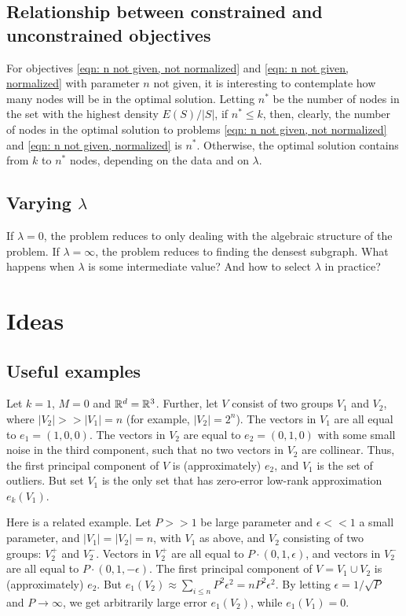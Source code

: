 \documentclass{article}
\begin{document}
\subsection{Relationship between constrained and unconstrained objectives}
For objectives \ref{eqn: n not given, not normalized} and \ref{eqn: n not given, normalized} with parameter $n$ not given, it is interesting to contemplate how many nodes will be in the optimal solution. Letting $n^*$ be the number of nodes in the set with the highest density $E(S)/|S|$,
if $n^* \leq k$, then, clearly, the number of nodes in the optimal solution to problems \ref{eqn: n not given, not normalized} and \ref{eqn: n not given, normalized} is $n^*$. Otherwise, the optimal solution contains from $k$ to $n^*$ nodes, depending on the data and on $\lambda$.

\subsection{Varying $\lambda$}
If $\lambda = 0$, the problem reduces to only dealing with the algebraic structure of the problem. If $\lambda = \infty$, the problem reduces to finding the densest subgraph. What happens when $\lambda$ is some intermediate value? And how to select $\lambda$ in practice?

\section{Ideas}
\subsection{Useful examples}
Let $k = 1$, $M = 0$ and $\mathbb{R}^d = \mathbb{R}^3$. Further, let $V$ consist of two groups $V_1$ and $V_2$, where $|V_2| >> |V_1| = n$ (for example, $|V_2|=2^n$). The vectors in $V_1$ are all equal to $e_1 = (1,0,0)$. The vectors in $V_2$ are equal to $e_2=(0,1,0)$ with some small noise in the third component, such that no two vectors in $V_2$ are collinear. Thus, the first principal component of $V$ is (approximately) $e_2$, and $V_1$ is the set of outliers. But set $V_1$ is the only set that has zero-error low-rank approximation $e_k(V_1)$.

Here is a related example. Let $P >> 1$ be large parameter and $\epsilon << 1$ a small parameter, and $|V_1| = |V_2| = n$, with $V_1$ as above, and $V_2$ consisting of two groups: $V_2^+$ and $V_2^-$. Vectors in $V_2^+$ are all equal to $P\cdot(0,1,\epsilon)$, and vectors in $V_2^-$ are all equal to $P\cdot(0,1,-\epsilon)$. The first principal component of $V = V_1\cup V_2$ is (approximately) $e_2$. But $e_1(V_2) \approx \sum_{i\leq n}P^2\epsilon^2 = n P^2\epsilon^2$. By letting $\epsilon = 1/\sqrt{P}$ and $P\to \infty$, we get arbitrarily large error $e_1(V_2)$, while $e_1(V_1) = 0$.
\end{document}
